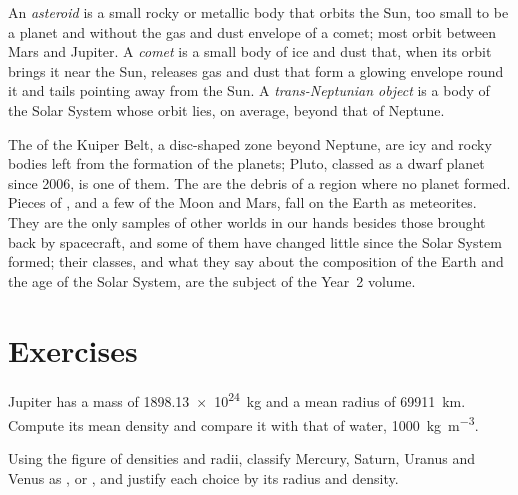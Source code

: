 \begin{definition}\label{def:b1:comparative-planetology:small-bodies}
An \emph{asteroid} is a small rocky or metallic body that
orbits the Sun, too small to be a planet and without the gas and dust
envelope of a comet; most orbit between Mars and Jupiter. A
\emph{comet} is a small body of ice and dust that, when its
orbit brings it near the Sun, releases gas and dust that form a glowing
envelope round it and tails pointing away from the Sun. A
\emph{trans-Neptunian object} is a body of
the Solar System whose orbit lies, on average, beyond that of Neptune.
\end{definition}

The  of the Kuiper Belt, a disc-shaped zone beyond
Neptune, are icy and rocky bodies left from the formation of the planets;
Pluto, classed as a dwarf planet since 2006, is one of them. The  are
the debris of a region where no planet formed. Pieces of , and a
few of the Moon and Mars, fall on the Earth as meteorites. They are the
only samples of other worlds in our hands besides those brought back by
spacecraft, and some of them have changed little since the Solar System
formed; their classes, and what they say about the composition of the Earth
and the age of the Solar System, are the subject of the Year~2 volume.

\section{Exercises}

\begin{exercise}[$\star$]\label{exo:b1:comparative-planetology:1}
Jupiter has a mass of \qty{1898.13e24}{kg} and a mean radius of
\qty{69911}{km}. Compute its mean density and compare it with that of water,
\qty{1000}{kg.m^{-3}}.
\end{exercise}

\begin{exercise}[$\star$]\label{exo:b1:comparative-planetology:2}
Using the figure of densities and radii, classify Mercury, Saturn, Uranus and
Venus as ,  or , and justify each
choice by its radius and density.
\end{exercise}

